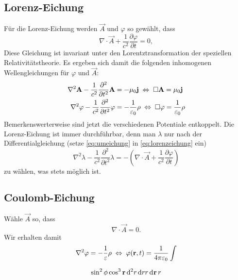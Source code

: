 \subsection{Lorenz-Eichung}

Für die Lorenz-Eichung werden $\vec {A}$ und $\varphi $ so gewählt, dass
\begin{equation}
	\label{eq:lorenzeichung}
	\nabla \cdot \vec {A}+\frac{1}{c^{2}}\frac{\partial \varphi }{\partial t}=0,
\end{equation}
Diese Gleichung ist invariant unter den Lorentztransformation der speziellen Relativitätstheorie. Es ergeben sich damit die folgenden inhomogenen Wellengleichungen für $\varphi $ und $\vec {A}$:
\begin{align*}
	\nabla ^{2}\vec {A}-\frac{1}{c^{2}}\frac{\partial ^{2}}{\partial t^{2}}\vec {A} & =-\mu _{0}\vec {j}\equivalence \Box \vec {A}=\mu _{0}\vec {j}                              \\
	\nabla ^{2}\varphi -\frac{1}{c^{2}}\frac{\partial ^{2}}{\partial t^{2}}\varphi  & =-\frac{1}{\varepsilon _{0}}\rho \equivalence \Box \varphi =\frac{1}{\varepsilon _{0}}\rho
\end{align*}
Bemerkenswerterweise sind jetzt die verschiedenen Potentiale entkoppelt. Die Lorenz-Eichung ist immer durchführbar, denn man $\lambda $ nur nach der Differentialgleichung (setze \eqref{eq:umeichung} in \eqref{eq:lorenzeichung} ein)
\begin{equation*}
	\nabla ^{2}\lambda -\frac{1}{c^{2}}\frac{\partial ^{2}}{\partial t^{2}}\lambda =-\left(\nabla \cdot \vec {A}+\frac{1}{c^{2}}\frac{\partial \varphi }{\partial t}\right)
\end{equation*}
zu wählen, was stets möglich ist.


\subsection{Coulomb-Eichung}

Wähle $\vec A$ so, dass
\begin{equation*}
	\nabla\cdot \vec A=0.
\end{equation*}
Wir erhalten damit 
\begin{equation*}
	\nabla^2\varphi=-\frac{1}{\varepsilon}\rho \equivalence \varphi(\vec r,t)=\frac{1}{4\pi\varepsilon_0}\int 
\end{equation*}

\begin{equation}
	\sin ^2{\phi} \cos^3\vec r \diffa[2] r  \diff rr\diffa{\vec{r}} r 
\end{equation}

